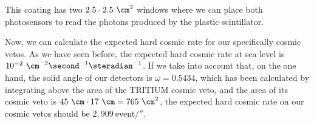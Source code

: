 This coating has two $2.5\cdot{} 2.5 ~\cm^2$ windows where we can place both photosensors to read the photons produced by the plastic scintillator.

Now, we can calculate the expected hard cosmic rate for our specifically cosmic vetos. As we have seen before, the expected hard cosmic rate at sea level is $10^{-2}~\cm^{-2}\second^{-1}\steradian^{-1}$. If we take into account that, on the one hand, the solid angle of our detectors is $\omega=0.5434$, which has been calculated by integrating above the area of the TRITIUM cosmic veto, and the area of its cosmic veto is $45~\cm \cdot{} 17~\cm=765~\cm^2$, the expected hard cosmic rate on our cosmic vetos should be $2,909~$event$/\second$.